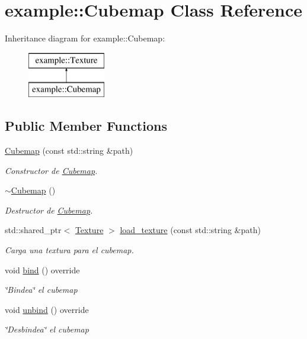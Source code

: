 \hypertarget{classexample_1_1_cubemap}{}\section{example\+::Cubemap Class Reference}
\label{classexample_1_1_cubemap}
Inheritance diagram for example\+::Cubemap\+:\begin{figure}[H]
\begin{center}
\leavevmode
\includegraphics[height=2.000000cm]{classexample_1_1_cubemap}
\end{center}
\end{figure}
\subsection*{Public Member Functions}
\begin{DoxyCompactItemize}
\item 
\mbox{\hyperlink{classexample_1_1_cubemap_ada15ba89709eb522748452e0544ae8c6}{Cubemap}} (const std\+::string \&path)
\begin{DoxyCompactList}\small\item\em Constructor de \mbox{\hyperlink{classexample_1_1_cubemap}{Cubemap}}. \end{DoxyCompactList}\item 
\mbox{\hyperlink{classexample_1_1_cubemap_aaafb4798ec24447afa68ea07f2e39501}{$\sim$\+Cubemap}} ()
\begin{DoxyCompactList}\small\item\em Destructor de \mbox{\hyperlink{classexample_1_1_cubemap}{Cubemap}}. \end{DoxyCompactList}\item 
std\+::shared\+\_\+ptr$<$ \mbox{\hyperlink{classexample_1_1_texture}{Texture}} $>$ \mbox{\hyperlink{classexample_1_1_cubemap_a18940faf62bea6cdef2fb306fd037b3c}{load\+\_\+texture}} (const std\+::string \&path)
\begin{DoxyCompactList}\small\item\em Carga una textura para el cubemap. \end{DoxyCompactList}\item 
void \mbox{\hyperlink{classexample_1_1_cubemap_a057cc50abb439ea55351ba52bea6d021}{bind}} () override
\begin{DoxyCompactList}\small\item\em \char`\"{}\+Bindea\char`\"{} el cubemap \end{DoxyCompactList}\item 
void \mbox{\hyperlink{classexample_1_1_cubemap_a95571938ee65dcb9dce352e175b63247}{unbind}} () override
\begin{DoxyCompactList}\small\item\em \char`\"{}\+Desbindea\char`\"{} el cubemap \end{DoxyCompactList}\end{DoxyCompactItemize}
